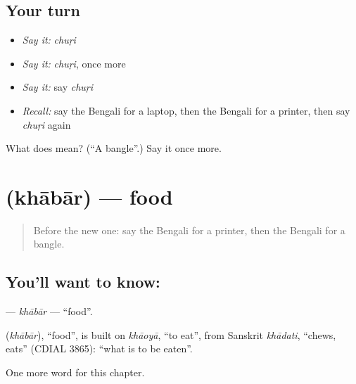 \subsection*{Your turn}
\begin{itemize}
\raggedright
  \item \emph{Say it:} \emph{chuṛi}
  \item \emph{Say it:} \emph{chuṛi}, once more
  \item \emph{Say it:} say \emph{chuṛi}
  \item \emph{Recall:} say the Bengali for a laptop, then the Bengali for a printer, then say \emph{chuṛi} again
\end{itemize}

\begin{tcolorbox}[breakable,colback=teal!4,colframe=teal!35!black,title={Before you move on}]
What does  mean? (\textquotedblleft{}A bangle\textquotedblright{}.) Say it once more.
\end{tcolorbox}
\section[\texorpdfstring{\bn{খাবার} (khābār)}{খাবার (khābār)}]{ (khābār) — food}

\label{lesson:BN-C223-khabar}



\begin{quote}
Before the new one: say the Bengali for a printer, then the Bengali for a bangle.
\end{quote}

\subsection*{You'll want to know: }
\textbf{} — \emph{khābār} — \textquotedblleft{}food\textquotedblright{}.

\begin{cousinweb}
\textbf{} (\emph{khābār}), \textquotedblleft{}food\textquotedblright{}, is built on \emph{khāoyā}, \textquotedblleft{}to eat\textquotedblright{}, from Sanskrit \emph{khādati}, \textquotedblleft{}chews, eats\textquotedblright{} (CDIAL 3865): \textquotedblleft{}what is to be eaten\textquotedblright{}.
\end{cousinweb}

\begin{grammarlens}[title={What you've built}]
One more word for this chapter.
\end{grammarlens}

